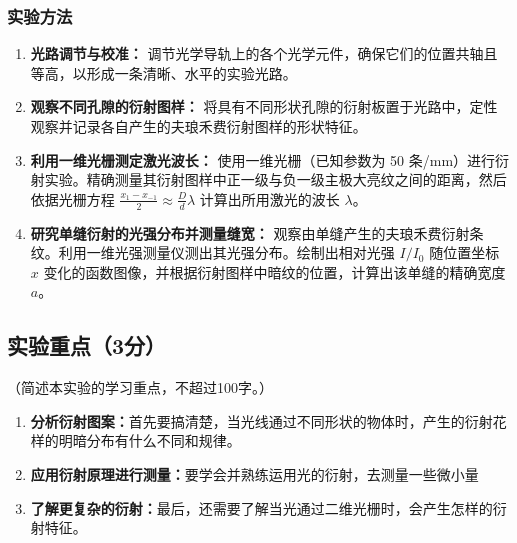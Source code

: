 \documentclass[yuxi]{../template/Report}%
\begin{document}
\subsubsection{实验方法}
\begin{enumerate}
    \item \textbf{光路调节与校准：}
    调节光学导轨上的各个光学元件，确保它们的位置共轴且等高，以形成一条清晰、水平的实验光路。

    \item \textbf{观察不同孔隙的衍射图样：}
    将具有不同形状孔隙的衍射板置于光路中，定性观察并记录各自产生的夫琅禾费衍射图样的形状特征。

    \item \textbf{利用一维光栅测定激光波长：}
    使用一维光栅（已知参数为 50 条/\si{\mm}）进行衍射实验。精确测量其衍射图样中正一级与负一级主极大亮纹之间的距离，然后依据光栅方程 $\frac{x_1 - x_{-1}}{2} \approx \frac{D}{d}\lambda$ 计算出所用激光的波长 $\lambda$。

    \item \textbf{研究单缝衍射的光强分布并测量缝宽：}
    观察由单缝产生的夫琅禾费衍射条纹。利用一维光强测量仪测出其光强分布。绘制出相对光强 $I/I_0$ 随位置坐标 $x$ 变化的函数图像，并根据衍射图样中暗纹的位置，计算出该单缝的精确宽度 $a$。

\end{enumerate}
\subsection{实验重点（3分）}
（简述本实验的学习重点，不超过100字。）
\begin{enumerate}
    \item \textbf{分析衍射图案：}首先要搞清楚，当光线通过不同形状的物体时，产生的衍射花样的明暗分布有什么不同和规律。
    \item \textbf{应用衍射原理进行测量：}要学会并熟练运用光的衍射，去测量一些微小量
    \item \textbf{了解更复杂的衍射：}最后，还需要了解当光通过二维光栅时，会产生怎样的衍射特征。
\end{enumerate}
\end{document}

